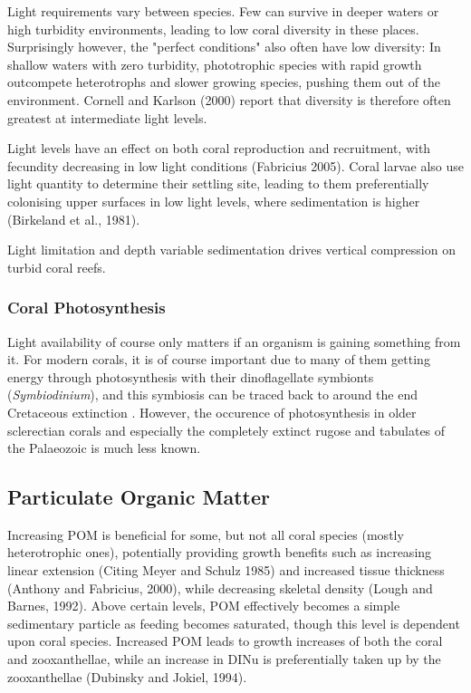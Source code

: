 \documentclass[11pt,a4paper]{article}
\begin{document}
Light requirements vary between species.
 Few can survive in deeper waters or high turbidity environments, leading to low coral diversity in these places.   
 Surprisingly however, the "perfect conditions" also often have low diversity: In shallow waters with zero turbidity, phototrophic species with rapid growth outcompete heterotrophs and slower growing species, pushing them out of the environment.
 Cornell and Karlson (2000) report that diversity is therefore often greatest at intermediate light levels. 

Light levels have an effect on both coral reproduction and recruitment, with fecundity decreasing in low light conditions (Fabricius 2005).
 Coral larvae also use light quantity to determine their settling site, leading to them preferentially colonising upper surfaces in low light levels, where sedimentation is higher (Birkeland et al., 1981). 

\cite{Morgan2020} Light limitation and depth variable sedimentation drives vertical compression on turbid coral reefs.

\subsubsection{Coral Photosynthesis}

Light availability of course only matters if an organism is gaining something from it.
 For modern corals, it is of course important due to many of them getting energy through photosynthesis with their dinoflagellate symbionts (\textit{Symbiodinium}), and this symbiosis can be traced back to around the end Cretaceous extinction \citep{Lipps2016photosynthesis}.
  However, the occurence of photosynthesis in older sclerectian corals and especially the completely extinct rugose and tabulates of the Palaeozoic is much less known. 

\subsection{Particulate Organic Matter}

Increasing POM is beneficial for some, but not all coral species (mostly heterotrophic ones), potentially providing growth benefits such as increasing linear extension (Citing Meyer and Schulz 1985) and increased tissue thickness (Anthony and Fabricius, 2000), while decreasing skeletal density (Lough and Barnes, 1992).
 Above certain levels, POM effectively becomes a simple sedimentary particle as feeding becomes saturated, though this level is dependent upon coral species.
  Increased POM leads to growth increases of both the coral and zooxanthellae, while an increase in DINu is preferentially taken up by the zooxanthellae (Dubinsky and Jokiel, 1994).
\end{document}
